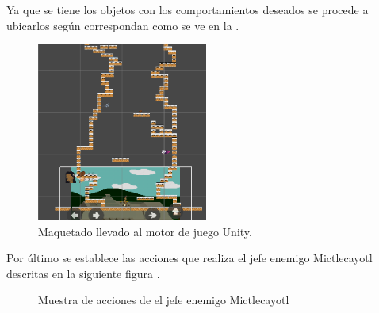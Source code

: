 Ya que se tiene los objetos con los comportamientos deseados se procede a ubicarlos según correspondan como se ve en la \cite{fig:n504}.
\begin{figure}
	\centering
	\caption{Maquetado llevado al motor de juego Unity.}
	\label{fig:n504}
	\includegraphics[width=0.5\textwidth]{03TrabajoRealizado/DocProduccionR/imagenes/n5/n501.png}
\end{figure}

Por último se establece las acciones que realiza el jefe enemigo Mictlecayotl descritas en la siguiente figura \cite{fig:n505}.
\begin{figure}[htbp]
	\centering
	\caption{Muestra de acciones de el jefe enemigo Mictlecayotl} \label{fig:n505}
\end{figure}
